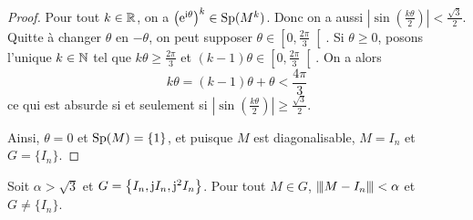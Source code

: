 \documentclass[12pt]{article}
\begin{document}
\begin{proof}
	Pour tout $k\in\mathbb{R}$, on a $\left(\mathrm{e}^{\mathrm{i}\theta}\right)^{k}\in\operatorname{Sp}(M^{k})$. Donc on a aussi $\left\lvert\sin\left(\frac{k\theta}{2}\right)\right\rvert<\frac{\sqrt{3}}{2}$. Quitte à changer $\theta$ en $-\theta$, on peut supposer $\theta\in\left[0,\frac{2\pi}{3}\right[$. Si $\theta\geqslant0$, posons l'unique $k\in\mathbb{N}$ tel que $k\theta\geqslant\frac{2\pi}{3}$ et $(k-1)\theta\in\left[0,\frac{2\pi}{3}\right[$. On a alors 
	\begin{equation}
		k\theta=(k-1)\theta+\theta<\frac{4\pi}{3}
	\end{equation}
	ce qui est absurde si et seulement si $\left\lvert\sin\left(\frac{k\theta}{2}\right)\right\rvert\geqslant\frac{\sqrt{3}}{2}$.

	Ainsi, $\theta=0$ et $\operatorname{Sp}(M)=\lbrace1\rbrace$, et puisque $M$ est diagonalisable, $M=I_{n}$ et $G=\lbrace I_{n}\rbrace$.
\end{proof}

\begin{remark}
	Soit $\alpha>\sqrt{3}$ et $G=\left\lbrace I_{n},\mathrm{j} I_{n},\mathrm{j}^{2} I_{n}\right\rbrace$. Pour tout $M\in G$, ${\left\vert\kern-0.25ex\left\vert\kern-0.25ex\left\vert{}M-I_{n} \right\vert\kern-0.25ex\right\vert\kern-0.25ex\right\vert}<\alpha$ et $G\neq\lbrace I_{n}\rbrace$.
\end{remark}
\end{document}
